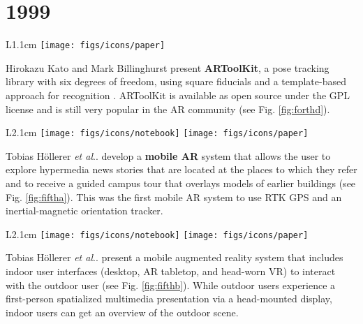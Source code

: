 \documentclass[12pt,a4paper]{article}
\makeatletter
\DeclareRobustCommand\onedot{\futurelet\@let@token\@onedot}
\def\@onedot{\ifx\@let@token.\else.\null\fi\xspace}
\def\etal{\emph{et al}\onedot}
\makeatother
\begin{document}
\vspace{-5pt}
\section*{1999}

\begin{wrapfigure}{L}{1.1cm}
	\vspace{-10pt}	
	\texttt{[image: figs/icons/paper]}
	\vspace{-15pt}		
\end{wrapfigure}
Hirokazu Kato and Mark Billinghurst present \textbf{ARToolKit}, a pose tracking library with six degrees of freedom, using square fiducials and a template-based approach for recognition \cite{Kato99}. ARToolKit is available as open source under the GPL license and is still very popular in the AR community (see Fig. \ref{fig:forthd}).

\vspace{0.1in}

\begin{wrapfigure}{L}{2.1cm}
	\vspace{-0pt}	
	\texttt{[image: figs/icons/notebook]}
	\texttt{[image: figs/icons/paper]}	
	\vspace{-20pt}		
\end{wrapfigure}
\noindent Tobias H\"ollerer \etal develop a \textbf{mobile AR} system that allows the user to explore hypermedia news stories that are located at the places to which they refer and to receive a guided campus tour that overlays models of earlier buildings \cite{Hollerer99} (see Fig. \ref{fig:fiftha}). This was the first mobile AR system to use RTK GPS and an inertial-magnetic orientation tracker.

\vspace{0.1in}

\begin{wrapfigure}{L}{2.1cm}
	\vspace{-15pt}	
	\texttt{[image: figs/icons/notebook]}
	\texttt{[image: figs/icons/paper]}	
	\vspace{-20pt}		
\end{wrapfigure}
\noindent Tobias H\"ollerer \etal present a mobile augmented reality system that includes indoor user interfaces (desktop, AR tabletop, and head-worn VR) to interact with the outdoor user \cite{Hollerer99b} (see Fig. \ref{fig:fifthb}). While outdoor users experience a first-person spatialized multimedia presentation via a head-mounted display, indoor users can get an overview of the outdoor scene.
\end{document}
